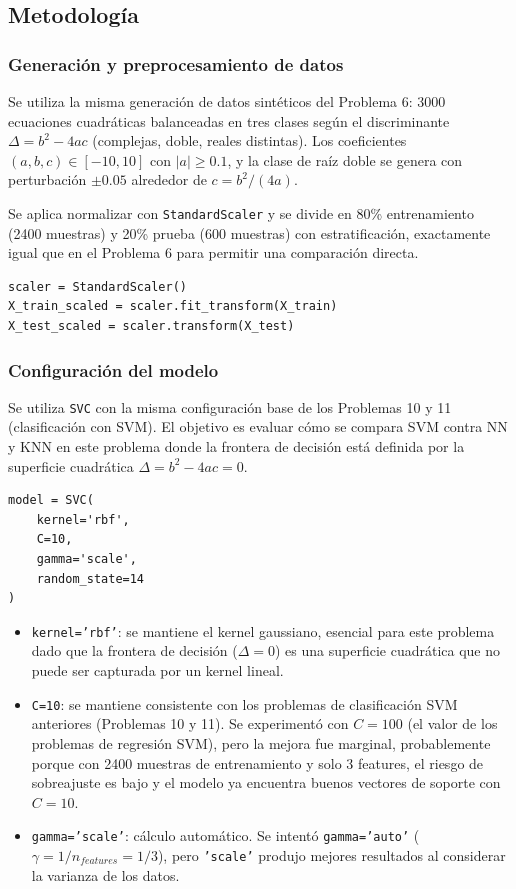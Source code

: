 \documentclass{article}
\begin{document}
\subsection{Metodología}

\subsubsection{Generación y preprocesamiento de datos}

Se utiliza la misma generación de datos sintéticos del Problema 6: 3000 ecuaciones cuadráticas balanceadas en tres clases según el discriminante $\Delta = b^2 - 4ac$ (complejas, doble, reales distintas). Los coeficientes $(a, b, c) \in [-10, 10]$ con $|a| \geq 0.1$, y la clase de raíz doble se genera con perturbación $\pm 0.05$ alrededor de $c = b^2/(4a)$.

Se aplica normalizar con \texttt{StandardScaler} y se divide en 80\% entrenamiento (2400 muestras) y 20\% prueba (600 muestras) con estratificación, exactamente igual que en el Problema 6 para permitir una comparación directa.

\begin{lstlisting}
scaler = StandardScaler()
X_train_scaled = scaler.fit_transform(X_train)
X_test_scaled = scaler.transform(X_test)
\end{lstlisting}

\subsubsection{Configuración del modelo}

Se utiliza \texttt{SVC} con la misma configuración base de los Problemas 10 y 11 (clasificación con SVM). El objetivo es evaluar cómo se compara SVM contra NN y KNN en este problema donde la frontera de decisión está definida por la superficie cuadrática $\Delta = b^2 - 4ac = 0$.

\begin{lstlisting}
model = SVC(
    kernel='rbf',
    C=10,
    gamma='scale',
    random_state=14
)
\end{lstlisting}

\begin{itemize}
    \item \texttt{kernel='rbf'}: se mantiene el kernel gaussiano, esencial para este problema dado que la frontera de decisión ($\Delta = 0$) es una superficie cuadrática que no puede ser capturada por un kernel lineal.
    \item \texttt{C=10}: se mantiene consistente con los problemas de clasificación SVM anteriores (Problemas 10 y 11). Se experimentó con $C=100$ (el valor de los problemas de regresión SVM), pero la mejora fue marginal, probablemente porque con 2400 muestras de entrenamiento y solo 3 features, el riesgo de sobreajuste es bajo y el modelo ya encuentra buenos vectores de soporte con $C=10$.
    \item \texttt{gamma='scale'}: cálculo automático. Se intentó \texttt{gamma='auto'} ($\gamma = 1/n_{features} = 1/3$), pero \texttt{'scale'} produjo mejores resultados al considerar la varianza de los datos.
\end{itemize}
\end{document}
